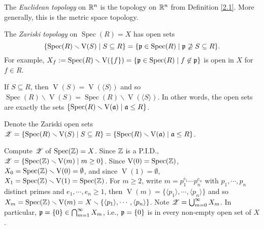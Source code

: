 \begin{example}\label{2.4}
    The \emph{Euclidean topology} on $\mathbb{R}^n$ is the topology on $\mathbb{R}^n$ from Definition \ref{2.1}. More generally, this is the metric space topology.
\end{example}

\begin{definition}\label{2.5}
    The \emph{Zariski topology} on $\operatorname{Spec}(R) = X$ has open sets 
    \[\{\operatorname{Spec}(R) \smallsetminus \operatorname{V}(S) \mid S \subseteq R\} = \{\mathfrak{p} \in \operatorname{Spec}(R) \mid \mathfrak{p} \not \supseteq S \subseteq R\}.\] 
    For example, $X_f := \operatorname{Spec}(R) \smallsetminus \operatorname{V}(\{f\}) = \{\mathfrak{p} \in \operatorname{Spec}(R) \mid f \not \in \mathfrak{p}\}$ is open in $X$ for $f \in R$.
\end{definition}

\begin{proposition}\label{2.6}
    If $S \subseteq R$, then $\operatorname{V}(S) = \operatorname{V}(\langle S \rangle)$ and so $\operatorname{Spec}(R) \smallsetminus \operatorname{V}(S) = \operatorname{Spec}(R) \smallsetminus \operatorname{V}(\langle S \rangle)$. In other words, the open sets are exactly the sets $\{\operatorname{Spec}(R) \smallsetminus \operatorname{V}(\mathfrak{a}) \mid \mathfrak{a} \leq R\}$. 
\end{proposition}

\begin{notation*}
    Denote the Zariski open sets $\mathscr{Z} = \{\operatorname{Spec}(R) \smallsetminus \operatorname{V}(S) \mid S \subseteq R\} = \{\operatorname{Spec}(R) \smallsetminus \operatorname{V}(\mathfrak{a}) \mid \mathfrak{a} \leq R\}$.
\end{notation*}

\begin{example}\label{2.7}
    Compute $\mathscr{Z}$ of $\operatorname{Spec}(\mathbb{Z}) = X$. Since $\mathbb{Z}$ is a P.I.D., $\mathscr{Z} = \{\operatorname{Spec}(\mathbb{Z}) \smallsetminus \operatorname{V}(m) \mid m \geq 0\}$. Since $\operatorname{V}(0) = \operatorname{Spec}(\mathbb{Z})$, $X_0 = \operatorname{Spec}(\mathbb{Z}) \smallsetminus \operatorname{V}(0) = \emptyset$, and since $\operatorname{V}(1) = \emptyset$, $X_1 = \operatorname{Spec}(\mathbb{Z}) \smallsetminus \operatorname{V}(1) = \operatorname{Spec}(\mathbb{Z})$. For $m \geq 2$, write $m = p_1^{e_1} \cdots p_n^{e_n}$ with $p_1,\cdots,p_n$ distinct primes and $e_1,\cdots,e_n \geq 1$, then $\operatorname{V}(m) = \{\langle p_1 \rangle, \cdots, \langle p_n \rangle\}$ and so $X_m = \operatorname{Spec}(\mathbb{Z}) \smallsetminus \operatorname{V}(m) = X \smallsetminus \{\langle p_1 \rangle,\cdots, \langle p_n \rangle\}$. Note $\mathscr{Z} = \bigcup_{m=0}^\infty X_m$. In particular, $\mathfrak{p} = \{0\} \in \bigcap_{m=1}^\infty X_m$, i.e., $\mathfrak{p} = \{0\}$ is in every non-empty open set of $X$.
\end{example}

